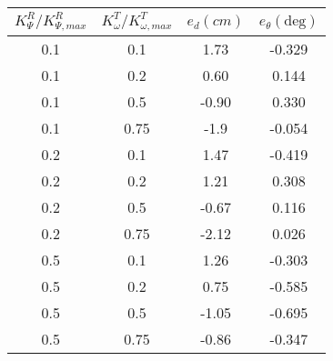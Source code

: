 


\begin{table}\centering
    \begin{tabular}{c|c|c|c}
    $K_{\Psi}^R / K_{\Psi,max}^R$ & $K_{\omega}^T / K_{\omega,max}^T$ & $e_{d}(cm)$  & $e_{\theta}(\text{deg})$ \\ \hline
    0.1        & 0.1          & 1.73    & -0.329      \\
    0.1        & 0.2          & 0.60    & 0.144      \\
    0.1        & 0.5          & -0.90  & 0.330      \\
    0.1        & 0.75         & -1.9    & -0.054      \\
    0.2        & 0.1          & 1.47    & -0.419      \\
    0.2        & 0.2          & 1.21    & 0.308      \\
    0.2        & 0.5          & -0.67   & 0.116      \\
    0.2        & 0.75         & -2.12   & 0.026      \\
    0.5        & 0.1          & 1.26    & -0.303     \\
    0.5        & 0.2          & 0.75    & -0.585     \\
    0.5        & 0.5          & -1.05   & -0.695     \\
    0.5        & 0.75         & -0.86   & -0.347      \\
    \end{tabular}
    \caption{}
    \label{tbl:19_errors}
\end{table}
